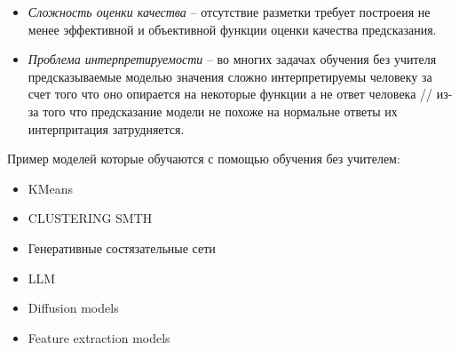 \documentclass[../part_1.tex]{subfiles}
\begin{document}
    \begin{itemize}
        \item \textit{Сложность оценки качества} -- отсутствие разметки требует построеия не менее эффективной и объективной функции оценки качества предсказания.
        \item \textit{Проблема интерпретируемости} -- во многих задачах обучения без учителя предсказываемые моделью значения сложно интерпретируемы человеку за счет того что оно опирается на некоторые функции а не ответ человека // из-за того что предсказание модели не похоже на нормальне ответы их интерпритация затрудняется. 
    \end{itemize}
    \par Пример моделей которые обучаются с помощью обучения без учителем:
    \begin{itemize}
        \item KMeans
        \item CLUSTERING SMTH
        \item Генеративные состязательные сети
        \item LLM
        \item Diffusion models
        \item Feature extraction models
    \end{itemize}
\end{document}
